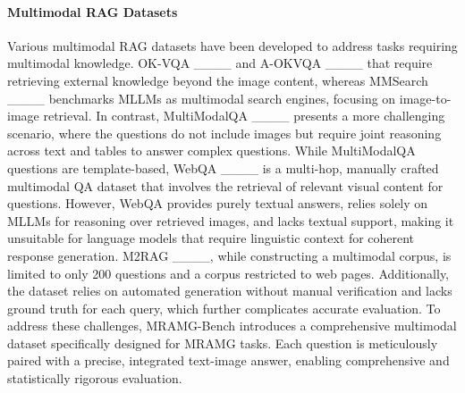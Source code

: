 \paragraph{Multimodal RAG Datasets}
Various multimodal RAG datasets have been developed to address tasks requiring multimodal knowledge. 
OK-VQA ____ and A-OKVQA ____ that require retrieving external knowledge beyond the image content, whereas MMSearch ____ benchmarks MLLMs as multimodal search engines, focusing on image-to-image retrieval.
In contrast, MultiModalQA ____ presents a more challenging scenario, where the questions do not include images but require joint reasoning across text and tables to answer complex questions.
While MultiModalQA questions are template-based, WebQA ____ is a multi-hop, manually crafted multimodal QA dataset that involves the retrieval of relevant visual content for questions.
However, WebQA provides purely textual answers, relies solely on MLLMs for reasoning over retrieved images, and lacks textual support, making it unsuitable for language models that require linguistic context for coherent response generation.
M2RAG ____, while constructing a multimodal corpus, is limited to only 200 questions and a corpus restricted to web pages. 
Additionally, the dataset relies on automated generation without manual verification and lacks ground truth for each query, which further complicates accurate evaluation.
To address these challenges, MRAMG-Bench introduces a comprehensive
multimodal dataset specifically designed for MRAMG tasks.  
Each question is meticulously paired with a precise, integrated text-image answer, enabling comprehensive and statistically rigorous evaluation.
\fi

